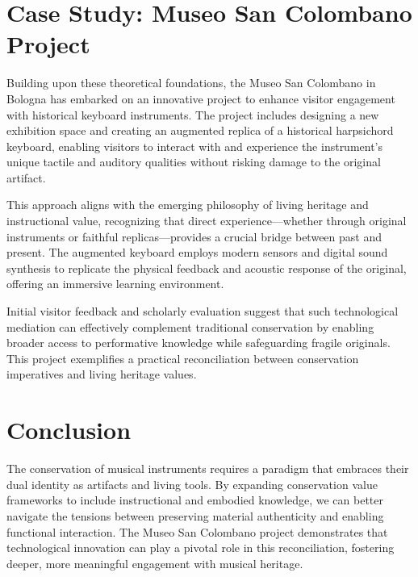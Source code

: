 
\section{Case Study: Museo San Colombano Project}

Building upon these theoretical foundations, the Museo San Colombano in Bologna has embarked on an innovative project to enhance visitor engagement with historical keyboard instruments. The project includes designing a new exhibition space and creating an augmented replica of a historical harpsichord keyboard, enabling visitors to interact with and experience the instrument’s unique tactile and auditory qualities without risking damage to the original artifact.

This approach aligns with the emerging philosophy of living heritage and instructional value, recognizing that direct experience—whether through original instruments or faithful replicas—provides a crucial bridge between past and present. The augmented keyboard employs modern sensors and digital sound synthesis to replicate the physical feedback and acoustic response of the original, offering an immersive learning environment.

Initial visitor feedback and scholarly evaluation suggest that such technological mediation can effectively complement traditional conservation by enabling broader access to performative knowledge while safeguarding fragile originals. This project exemplifies a practical reconciliation between conservation imperatives and living heritage values.

\section{Conclusion}

The conservation of musical instruments requires a paradigm that embraces their dual identity as artifacts and living tools. By expanding conservation value frameworks to include instructional and embodied knowledge, we can better navigate the tensions between preserving material authenticity and enabling functional interaction. The Museo San Colombano project demonstrates that technological innovation can play a pivotal role in this reconciliation, fostering deeper, more meaningful engagement with musical heritage.

